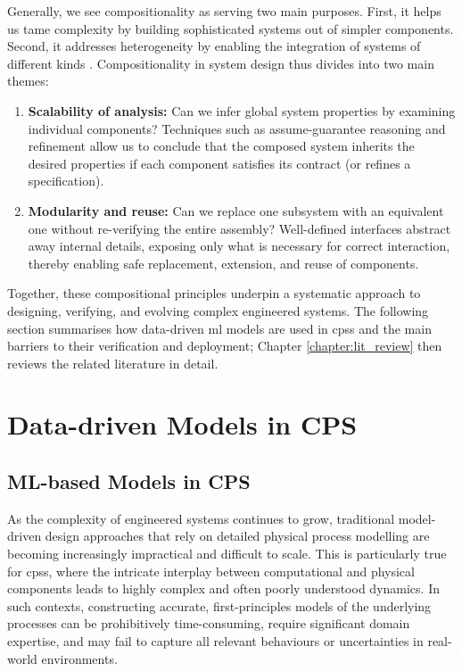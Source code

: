 Generally, we see compositionality as serving two main purposes. First, it helps us tame complexity by building sophisticated systems out of simpler components. Second, it addresses heterogeneity by enabling the integration of systems of different kinds \cite{1173203}. Compositionality in system design thus divides into two main themes:
\begin{enumerate}
  \item \textbf{Scalability of analysis:}  Can we infer global system properties by examining individual components? Techniques such as assume-guarantee reasoning and refinement allow us to conclude that the composed system inherits the desired properties if each component satisfies its contract (or refines a specification).
  \item \textbf{Modularity and reuse:}  Can we replace one subsystem with an equivalent one without re-verifying the entire assembly? Well-defined interfaces abstract away internal details, exposing only what is necessary for correct interaction, thereby enabling safe replacement, extension, and reuse of components.
\end{enumerate}

Together, these compositional principles underpin a systematic approach to designing, verifying, and evolving complex engineered systems. The following section summarises how data-driven \gls{ml} models are used in \glspl{cps} and the main barriers to their verification and deployment; Chapter \ref{chapter:lit_review} then reviews the related literature in detail.


\section{Data-driven Models in CPS}
\label{sec:lit_ann_cps}

\subsection{ML-based Models in CPS}

As the complexity of engineered systems continues to grow, traditional model-driven design approaches that rely on detailed physical process modelling are becoming increasingly impractical and difficult to scale. This is particularly true for \glspl{cps}, where the intricate interplay between computational and physical components leads to highly complex and often poorly understood dynamics. In such contexts, constructing accurate, first-principles models of the underlying processes can be prohibitively time-consuming, require significant domain expertise, and may fail to capture all relevant behaviours or uncertainties in real-world environments.

